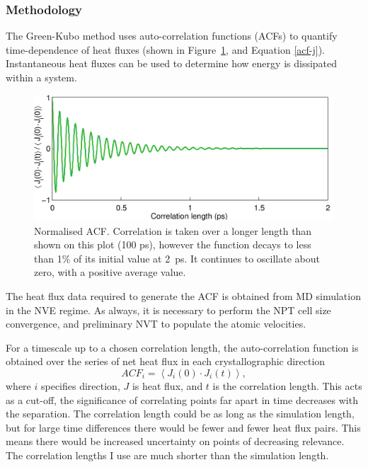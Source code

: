 \subsubsection{Methodology}


The Green-Kubo method uses auto-correlation functions (ACFs) to quantify time-dependence of heat fluxes (shown in Figure~\ref{fig:gk_acf}, and Equation \ref{acf-j}). Instantaneous heat fluxes can be used to determine how energy is dissipated within a system.%

\begin{figure}[h]
\includegraphics[width=\linewidth]{Figures/gk_acf.png}
\caption{Normalised ACF. Correlation is taken over a longer length than shown on this plot (100 ps), however the function decays to less than 1\% of its initial value at 2~ps. It continues to oscillate about zero, with a positive average value.}
\label{fig:gk_acf}
\end{figure}

The heat flux data required to generate the ACF is obtained from MD simulation in the NVE regime. As always, it is necessary to perform the NPT cell size convergence, and preliminary NVT to populate the atomic velocities.

For a timescale up to a chosen correlation length, the auto-correlation function is obtained over the series of net heat flux in each crystallographic direction
%
\begin{equation}
ACF_i = \left \langle J_i(0) \cdot  J_i(t) \right \rangle,
\label{acf-j}
\end{equation}
%
where $i$ specifies direction, $J$ is heat flux, and $t$ is the correlation length. This acts as a cut-off, the significance of correlating points far apart in time decreases with the separation. The correlation length could be as long as the simulation length, but for large time differences there would be fewer and fewer heat flux pairs. This means there would be increased uncertainty on points of decreasing relevance. The correlation lengths I use are much shorter than the simulation length.  

